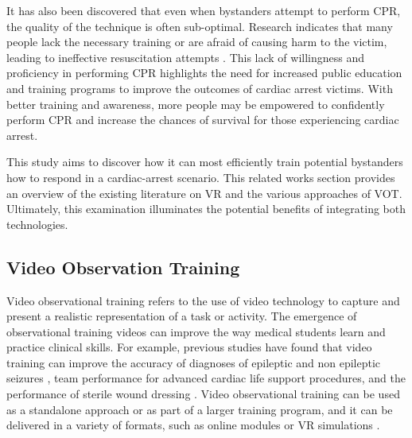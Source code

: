 \documentclass[manuscript]{./Models/acmart}
\begin{document}
It has also been discovered that even when bystanders attempt to perform CPR, the quality of the technique is often sub-optimal. Research indicates that many people lack the necessary training or are afraid of causing harm to the victim, leading to ineffective resuscitation attempts \cite{bobrow-2010}. This lack of willingness and proficiency in performing CPR highlights the need for increased public education and training programs to improve the outcomes of cardiac arrest victims. With better training and awareness, more people may be empowered to confidently perform CPR and increase the chances of survival for those experiencing cardiac arrest.

This study aims to discover how it can most efficiently train potential bystanders how to respond in a cardiac-arrest scenario. This related works section provides an overview of the existing literature on VR and the various approaches of VOT. Ultimately, this examination illuminates the potential benefits of integrating both technologies.

\subsection{Video Observation Training}
Video observational training refers to the use of video technology to capture and present a realistic representation of a task or activity. The emergence of observational training videos can improve the way medical students learn and practice clinical skills. For example, previous studies have found that video training can improve the accuracy of diagnoses of epileptic and non epileptic seizures \cite{seneviratne-2014}, team performance for advanced cardiac life support procedures\cite{Lau-2019}, and the performance of sterile wound dressing \cite{boecker-2022}. Video observational training can be used as a standalone approach or as part of a larger training program, and it can be delivered in a variety of formats, such as online modules or VR simulations \cite{jang-2014}.
\end{document}
